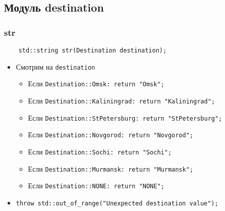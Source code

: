 \subsection{Модуль destination}

\subsubsection{str}

\begin{lstlisting}
    std::string str(Destination destination);
\end{lstlisting}

\begin{itemize}
    \item Смотрим на \verb|destination|
    \begin{itemize}
        \item Если \verb|Destination::Omsk: return "Omsk";|
        \item Если \verb|Destination::Kaliningrad: return "Kaliningrad";|
        \item Если \verb|Destination::StPetersburg: return "StPetersburg";|
        \item Если \verb|Destination::Novgorod: return "Novgorod";|
        \item Если \verb|Destination::Sochi: return "Sochi";|
        \item Если \verb|Destination::Murmansk: return "Murmansk";|
        \item Если \verb|Destination::NONE: return "NONE";|
    \end{itemize}  
    \item \verb|throw std::out_of_range("Unexpected destination value");|
\end{itemize}

